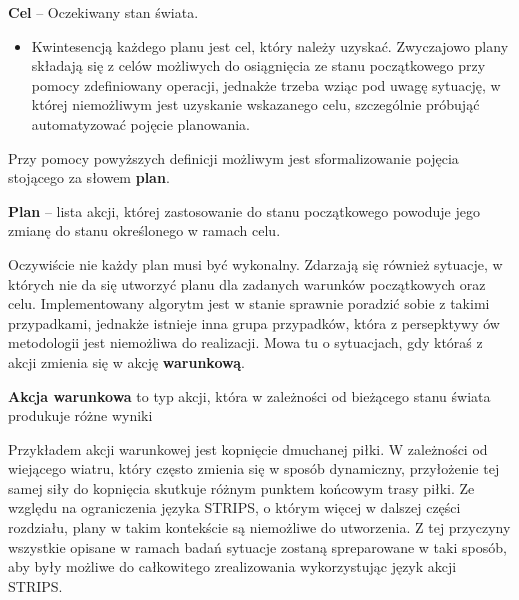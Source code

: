     \begin{definition}
    \label{Cel}
        \textbf{Cel} -- Oczekiwany stan świata.
    \end{definition}
    \begin{itemize}
        \item Kwintesencją każdego planu jest cel, który należy uzyskać. Zwyczajowo plany składają się z celów możliwych do
        osiągnięcia ze stanu początkowego przy pomocy zdefiniowany operacji, jednakże trzeba wziąc pod uwagę sytuację, w której 
        niemożliwym jest uzyskanie wskazanego celu, szczególnie próbująć automatyzować pojęcie planowania.
    \end{itemize} 
    Przy pomocy powyższych definicji możliwym jest sformalizowanie pojęcia stojącego za słowem \textbf{plan}. 
    \begin{definition}
    \label{Plan}
    \textbf{Plan} -- lista akcji, której zastosowanie do stanu początkowego powoduje jego zmianę do stanu określonego w ramach celu. 
    \end{definition}

    Oczywiście nie każdy plan musi być wykonalny. Zdarzają się również sytuacje, w których nie da się utworzyć planu dla zadanych warunków 
    początkowych oraz celu. Implementowany algorytm jest w stanie sprawnie poradzić sobie z takimi przypadkami,
    jednakże istnieje inna grupa przypadków, która z persepktywy ów metodologii jest niemożliwa do realizacji. 
    Mowa tu o sytuacjach, gdy któraś z akcji zmienia się w akcję \textbf{warunkową}.
    \begin{definition}
        \label{Akcja warunkowa}
        \textbf{Akcja warunkowa} to typ akcji, która w zależności od bieżącego stanu świata produkuje różne wyniki
    \end{definition}

    Przykładem akcji warunkowej jest kopnięcie dmuchanej piłki. W zależności od wiejącego wiatru, który często zmienia się w sposób dynamiczny, 
    przyłożenie tej samej siły do kopnięcia skutkuje różnym punktem końcowym trasy piłki. Ze względu na ograniczenia języka STRIPS,
    o którym więcej w dalszej części rozdziału, plany w 
    takim kontekście są niemożliwe do utworzenia. Z tej przyczyny wszystkie opisane w ramach badań sytuacje zostaną spreparowane w taki sposób, aby
    były możliwe do całkowitego zrealizowania wykorzystując język akcji STRIPS.
    
